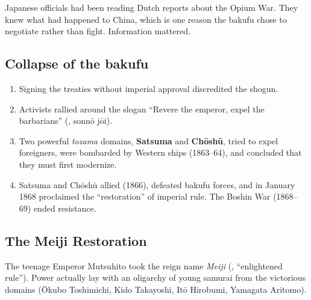 \begin{aside}
Japanese officials had been reading Dutch reports about the Opium War. They knew what had
happened to China, which is one reason the bakufu chose to negotiate rather than fight.
Information mattered.
\end{aside}

\subsection{Collapse of the bakufu}

\begin{enumerate}
  \item Signing the treaties without imperial approval discredited the shogun.
  \item Activists rallied around the slogan ``Revere the emperor, expel the barbarians''
        (, sonnō jōi).
  \item Two powerful \emph{tozama} domains, \textbf{Satsuma} and \textbf{Chōshū}, tried to
        expel foreigners, were bombarded by Western ships (1863--64), and concluded that
        they must first modernize.
  \item Satsuma and Chōshū allied (1866), defeated bakufu forces, and in January 1868
        proclaimed the ``restoration'' of imperial rule. The Boshin War (1868--69) ended
        resistance.
\end{enumerate}

\subsection{The Meiji Restoration}

The teenage Emperor Mutsuhito took the reign name \emph{Meiji} (, ``enlightened
rule''). Power actually lay with an oligarchy of young samurai from the victorious domains
(Ōkubo Toshimichi, Kido Takayoshi, Itō Hirobumi, Yamagata Aritomo).

